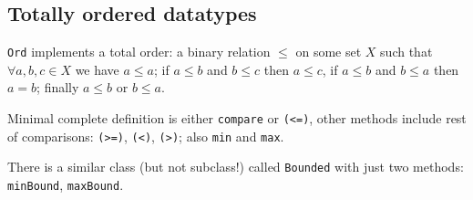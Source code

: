 %

\subsection{Totally ordered datatypes}
\texttt{Ord} implements a total order: a binary relation $\le$ on some set $X$ such that $\forall a, b, c \in X$ we have $a \le a$; if $a \le b$ and $b \le c$ then $a \le c$, if $a \le b$ and $b \le a$ then $a = b$; finally $a \le b$ or $b \le a$.

Minimal complete definition is either \texttt{compare} or \texttt{(<=)}, other methods include rest of comparisons: \texttt{(>=)}, \texttt{(<)}, \texttt{(>)}; also \texttt{min} and \texttt{max}.

There is a similar class (but not subclass!) called \texttt{Bounded} with just two methods: \texttt{minBound}, \texttt{maxBound}.

%